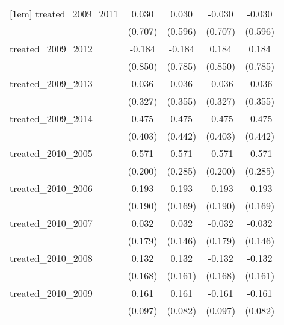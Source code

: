 {\begin{tabular}{l*{4}{c}}
[1em]
treated\_2009\_2011&       0.030         &       0.030         &      -0.030         &      -0.030         \\
            &     (0.707)         &     (0.596)         &     (0.707)         &     (0.596)         \\
[1em]
treated\_2009\_2012&      -0.184         &      -0.184         &       0.184         &       0.184         \\
            &     (0.850)         &     (0.785)         &     (0.850)         &     (0.785)         \\
[1em]
treated\_2009\_2013&       0.036         &       0.036         &      -0.036         &      -0.036         \\
            &     (0.327)         &     (0.355)         &     (0.327)         &     (0.355)         \\
[1em]
treated\_2009\_2014&       0.475         &       0.475         &      -0.475         &      -0.475         \\
            &     (0.403)         &     (0.442)         &     (0.403)         &     (0.442)         \\
[1em]
treated\_2010\_2005&       0.571\sym{**} &       0.571\sym{*}  &      -0.571\sym{**} &      -0.571\sym{*}  \\
            &     (0.200)         &     (0.285)         &     (0.200)         &     (0.285)         \\
[1em]
treated\_2010\_2006&       0.193         &       0.193         &      -0.193         &      -0.193         \\
            &     (0.190)         &     (0.169)         &     (0.190)         &     (0.169)         \\
[1em]
treated\_2010\_2007&       0.032         &       0.032         &      -0.032         &      -0.032         \\
            &     (0.179)         &     (0.146)         &     (0.179)         &     (0.146)         \\
[1em]
treated\_2010\_2008&       0.132         &       0.132         &      -0.132         &      -0.132         \\
            &     (0.168)         &     (0.161)         &     (0.168)         &     (0.161)         \\
[1em]
treated\_2010\_2009&       0.161         &       0.161\sym{*}  &      -0.161         &      -0.161\sym{*}  \\
            &     (0.097)         &     (0.082)         &     (0.097)         &     (0.082)         \\

\end{tabular}}
